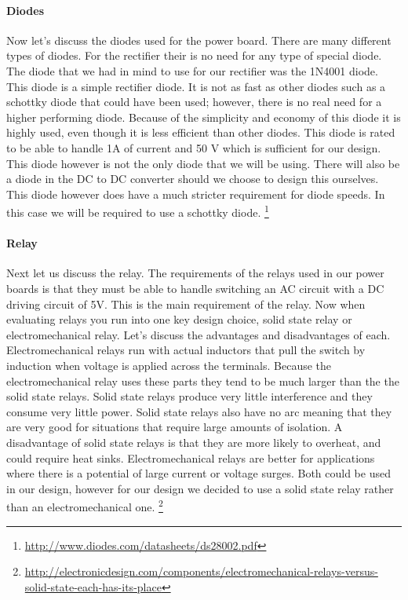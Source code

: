 \paragraph{Diodes}

Now let{}'s discuss the diodes used for the power board. There are many
different types of diodes. For the rectifier their is no need for any type of
special diode. The diode that we had in mind to use for our rectifier was the
1N4001 diode. This diode is a simple rectifier diode. It is not as fast as
other diodes such as a schottky diode that could have been used; however, there
is no real need for a higher performing diode. Because of the simplicity and
economy of this diode it is highly used, even though it is less efficient than
other diodes. This diode is rated to be able to handle 1A of current and 50 V
which is sufficient for our design. This diode however is not the only diode
that we will be using. There will also be a diode in the DC to DC converter
should we choose to design this ourselves. This diode however does have a much
stricter requirement for diode speeds. In this case we will be required to use
a schottky diode.
\footnote{\url{http://www.diodes.com/datasheets/ds28002.pdf}}

\paragraph{Relay}
Next let us discuss the relay. The requirements of the relays used in our power
boards is that they must be able to handle switching an AC circuit with a DC
driving circuit of 5V. This is the main requirement of the relay. Now when
evaluating relays you run into one key design choice, solid state relay or
electromechanical relay. Let{}'s discuss the advantages and disadvantages of
each. Electromechanical relays run with actual inductors that pull the switch
by induction when voltage is applied across the terminals. Because the
electromechanical relay uses these parts they tend to be much larger than the
the solid state relays. Solid state relays produce very little interference and
they consume very little power. Solid state relays also have no arc meaning
that they are very good for situations that require large amounts of isolation.
A disadvantage of solid state relays is that they are more likely to overheat,
and could require heat sinks. Electromechanical relays are better for
applications where there is a potential of large current or voltage surges.
Both could be used in our design, however for our design we decided to use a
solid state relay rather than an electromechanical one.
\footnote{\url{http://electronicdesign.com/components/electromechanical-relays-versus-solid-state-each-has-its-place}}

